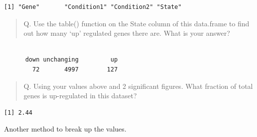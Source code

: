 \documentclass[
  letterpaper,
  DIV=11,
  numbers=noendperiod]{scrartcl}
\newenvironment{Shaded}{\begin{snugshade}}{\end{snugshade}}
\newcommand{\DecValTok}[1]{\textcolor[rgb]{0.68,0.00,0.00}{#1}}
\newcommand{\FunctionTok}[1]{\textcolor[rgb]{0.28,0.35,0.67}{#1}}
\newcommand{\NormalTok}[1]{\textcolor[rgb]{0.00,0.23,0.31}{#1}}
\newcommand{\OtherTok}[1]{\textcolor[rgb]{0.00,0.23,0.31}{#1}}
\newcommand{\SpecialCharTok}[1]{\textcolor[rgb]{0.37,0.37,0.37}{#1}}
\newcommand{\StringTok}[1]{\textcolor[rgb]{0.13,0.47,0.30}{#1}}
\begin{document}
\begin{verbatim}
[1] "Gene"       "Condition1" "Condition2" "State"     
\end{verbatim}

\begin{quote}
Q. Use the table() function on the State column of this data.frame to
find out how many `up' regulated genes there are. What is your answer?
\end{quote}

\begin{Shaded}
\end{Shaded}

\begin{verbatim}

      down unchanging         up 
        72       4997        127 
\end{verbatim}

\begin{quote}
Q. Using your values above and 2 significant figures. What fraction of
total genes is up-regulated in this dataset?
\end{quote}

\begin{Shaded}
\end{Shaded}

\begin{verbatim}
[1] 2.44
\end{verbatim}

Another method to break up the values.

\begin{Shaded}
\end{Shaded}
\end{document}
